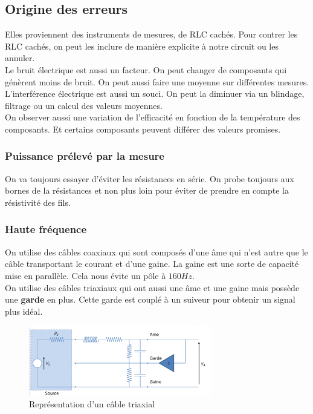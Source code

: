 \documentclass{report}
\begin{document}
\subsection{Origine des erreurs}
Elles proviennent des instruments de mesures, de RLC cachés. Pour contrer les RLC cachés, on peut les inclure de manière explicite à notre circuit ou les annuler.\\
Le bruit électrique est aussi un facteur. On peut changer de composants qui génèrent moins de bruit. On peut aussi faire une moyenne sur différentes mesures.\\
L'interférence électrique est aussi un souci. On peut la diminuer via un blindage, filtrage ou un calcul des valeurs moyennes.\\
On observer aussi une variation de l'efficacité en fonction de la température des composants. Et certains composants peuvent différer des valeurs promises.
\subsubsection{Puissance prélevé par la mesure}
On va toujours essayer d'éviter les résistances en série. On probe toujours aux bornes de la résistances et non plus loin pour éviter de prendre en compte la résistivité des fils.

\subsubsection{Haute fréquence}
On utilise des câbles coaxiaux qui sont composés d'une âme qui n'est autre que le câble transportant le courant et d'une gaine. La gaine est une sorte de capacité mise en parallèle. Cela nous évite un pôle à $160 Hz$.\\

On utilise des câbles triaxiaux qui ont aussi une âme et une gaine mais possède une \textbf{garde} en plus. Cette garde est couplé à un suiveur pour obtenir un signal plus idéal.
\begin{figure}[H]
\centering
\includegraphics[width=8cm]{img/triaxial.png}
\caption{Représentation d'un câble triaxial}
\end{figure}
\end{document}
